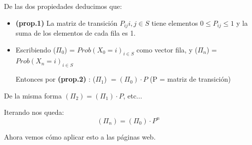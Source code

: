 \newpage
De las dos propiedades deducimos que:
\begin{itemize}
	\item \textbf{(prop.1)} La matriz de transición $P_{ij} i,j \in S$ tiene elementos $0 \leq P_{ij} \leq 1$ y la suma de los elementos de cada fila es 1.
	\item Escribiendo ($\Pi_0$) = ${Prob (X_0 =i)}_{i \in S}$ como vector fila, y ($\Pi_n$) = ${Prob (X_n =i)}_{i \in S}$

	Entonces por \textbf{(prop.2)} : ($\Pi_1$) $ = (\Pi_0)\cdot P$ (P = matriz de transición)
\end{itemize}

De la misma forma $(\Pi_2) = (\Pi_1) \cdot P$, etc...

Iterando nos queda:
$$\left(\Pi_n\right) = \left(\Pi_0\right) \cdot P^n$$

Ahora vemos cómo aplicar esto a las páginas web.


